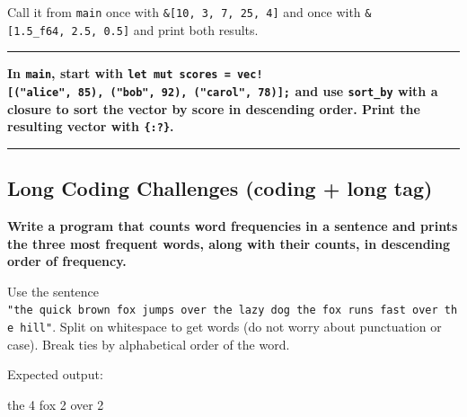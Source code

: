 \documentclass[
  11pt,
]{article}
\newenvironment{Shaded}{}{}
\newcommand{\NormalTok}[1]{#1}
\begin{document}
Call it from \texttt{main} once with
\texttt{\&{[}10,\ 3,\ 7,\ 25,\ 4{]}} and once with
\texttt{\&{[}1.5\_f64,\ 2.5,\ 0.5{]}} and print both results.

\begin{Shaded}
\begin{Highlighting}[]


\end{Highlighting}
\end{Shaded}

\begin{center}\rule{0.5\linewidth}{0.5pt}\end{center}

\textbf{In \texttt{main}, start with
\texttt{let\ mut\ scores\ =\ vec!{[}("alice",\ 85),\ ("bob",\ 92),\ ("carol",\ 78){]};}
and use \texttt{sort\_by} with a closure to sort the vector by score in
descending order. Print the resulting vector with \texttt{\{:?\}}.}

\begin{Shaded}
\begin{Highlighting}[]


\end{Highlighting}
\end{Shaded}

\begin{center}\rule{0.5\linewidth}{0.5pt}\end{center}

\subsection{Long Coding Challenges (coding + long
tag)}\label{long-coding-challenges-coding-long-tag}

\textbf{Write a program that counts word frequencies in a sentence and
prints the three most frequent words, along with their counts, in
descending order of frequency.}

Use the sentence
\texttt{"the\ quick\ brown\ fox\ jumps\ over\ the\ lazy\ dog\ the\ fox\ runs\ fast\ over\ the\ hill"}.
Split on whitespace to get words (do not worry about punctuation or
case). Break ties by alphabetical order of the word.

Expected output:

\begin{Shaded}
\begin{Highlighting}[]
\NormalTok{the 4}
\NormalTok{fox 2}
\NormalTok{over 2}
\end{Highlighting}
\end{Shaded}
\end{document}

